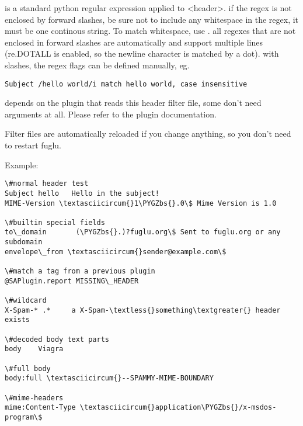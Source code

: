 \documentclass[letterpaper,10pt,english]{sphinxmanual}
\def\PYGZbs{\char`\\}
\begin{document}
 is a standard python regular expression applied to \textless{}header\textgreater{}. if the regex is not enclosed by forward slashes, be sure not to include any whitespace in the regex, it must be one continous string. To match whitespace, use . all regexes that are not enclosed in forward slashes are automatically  and support multiple lines (re.DOTALL is enabled, so the newline character is matched by a dot). with slashes, the regex flags can be defined manually, eg.

\begin{Verbatim}[commandchars=\\\{\}]
Subject /hello world/i match hello world, case insensitive
\end{Verbatim}

 depends on the plugin that reads this header filter file, some don't need arguments at all. Please refer to the plugin documentation.

Filter files are automatically reloaded if you change anything, so you don't need to restart fuglu.

Example:

\begin{Verbatim}[commandchars=\\\{\}]
\#normal header test
Subject hello   Hello in the subject!
MIME-Version \textasciicircum{}1\PYGZbs{}.0\$ Mime Version is 1.0

\#builtin special fields
to\_domain       (\PYGZbs{}.)?fuglu.org\$ Sent to fuglu.org or any subdomain
envelope\_from \textasciicircum{}sender@example.com\$

\#match a tag from a previous plugin
@SAPlugin.report MISSING\_HEADER

\#wildcard
X-Spam-* .*     a X-Spam-\textless{}something\textgreater{} header exists

\#decoded body text parts
body    Viagra

\#full body
body:full \textasciicircum{}--SPAMMY-MIME-BOUNDARY

\#mime-headers
mime:Content-Type \textasciicircum{}application\PYGZbs{}/x-msdos-program\$
\end{Verbatim}
\end{document}
